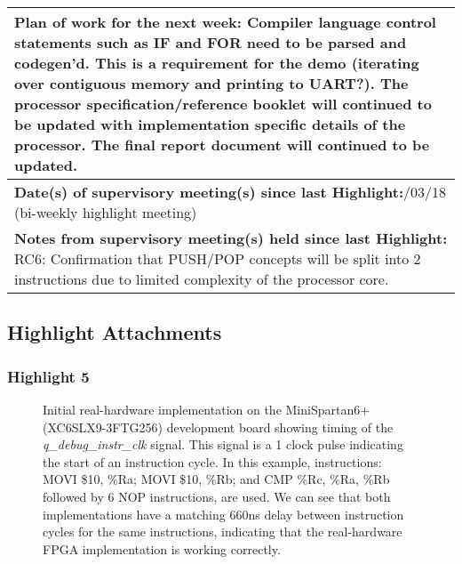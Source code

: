 \begin{table}[H]
\begin{tabularx}{\textwidth}{|X|}
	
	
	\textbf{Plan of work for the next week:}\newline
    Compiler language control statements such as IF and FOR need to be parsed and codegen'd. This is a requirement for the demo (iterating over contiguous memory and printing to UART?).
	\newline\newline
	The processor specification/reference booklet will continued to be updated with implementation specific details of the processor.
	\newline\newline
	The final report document will continued to be updated.
	\\ \hline
	
	
	\textbf{Date(s) of supervisory meeting(s) since last Highlight:}\newline
	12/03/18 (bi-weekly highlight meeting)
	\\ \hline
	
	
	\textbf{Notes from supervisory meeting(s) held since last Highlight:}\newline
	RC6: Confirmation that PUSH/POP concepts will be split into 2 instructions due to limited complexity of the processor core.
	\\ \hline
    \end{tabularx}
\end{table}


\newpage
\subsection*{Highlight Attachments}
\subsubsection*{Highlight 5}
\begin{figure}[H]%
    \centering
    \qquad
    \caption[]{Initial real-hardware implementation on the MiniSpartan6+ (XC6SLX9-3FTG256) development board showing timing of the \textit{q\_debug\_instr\_clk} signal. This signal is a 1 clock pulse indicating the start of an instruction cycle. In this example, instructions: MOVI \$10, \%Ra; MOVI \$10, \%Rb; and CMP \%Rc, \%Ra, \%Rb followed by 6 NOP instructions, are used.\newline\newline
    We can see that both implementations have a matching 660ns delay between instruction cycles for the same instructions, indicating that the real-hardware FPGA implementation is working correctly.}
    \label{fig:h5_impl}
\end{figure}

